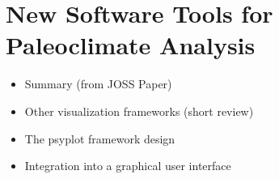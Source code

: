 
\part{New Software Tools for Paleoclimate Analysis}  \label{part:software}


\label{chp:psyplot}



\begin{itemize}
	\item Summary (from JOSS Paper)
	\item Other visualization frameworks (short review)
	\item The psyplot framework design
	\item Integration into a graphical user interface
\end{itemize}